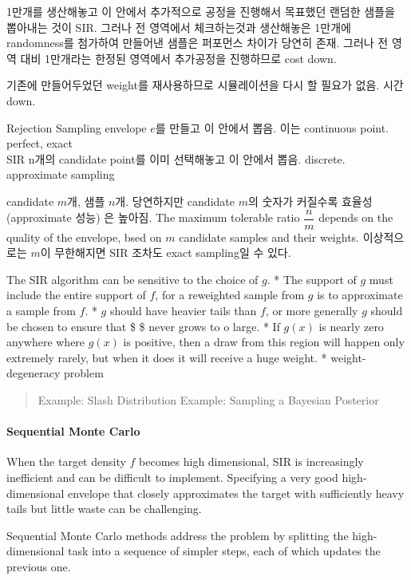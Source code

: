\documentclass[
]{book}
\begin{document}
1만개를 생산해놓고 이 안에서 추가적으로 공정을 진행해서 목표했던 랜덤한 샘플을 뽑아내는 것이 SIR. 그러나 전 영역에서 체크하는것과 생산해놓은 1만개에 randomness를 첨가하여 만들어낸 샘플은 퍼포먼스 차이가 당연히 존재. 그러나 전 영역 대비 1만개라는 한정된 영역에서 추가공정을 진행하므로 cost down.

기존에 만들어두었던 weight를 재사용하므로 시뮬레이션을 다시 할 필요가 없음. 시간 down.

Rejection Sampling \textbar{} envelope \(e\)를 만들고 이 안에서 뽑음. 이는 continuous point. \textbar{} perfect, exact \textbar{}\\
SIR \textbar{} n개의 candidate point를 이미 선택해놓고 이 안에서 뽑음. discrete. \textbar{} approximate sampling \textbar{}

candidate \(m\)개, 샘플 \(n\)개. 당연하지만 candidate \(m\)의 숫자가 커질수록 효율성 (approximate 성능) 은 높아짐. The maximum tolerable ratio \(\dfrac n m\) depends on the quality of the envelope, bsed on \(m\) candidate samples and their weights. 이상적으로는 \(m\)이 무한해지면 SIR 조차도 exact sampling일 수 있다.

The SIR algorithm can be sensitive to the choice of \(g\).
* The support of \(g\) must include the entire support of \(f\), for a reweighted sample from \(g\) is to approximate a sample from \(f\).
* \(g\) should have heavier tails than \(f\), or more generally \(g\) should be chosen to ensure that \$ \$ never grows to o large.
* If \(g(x)\) is nearly zero anywhere where \(g(x)\) is positive, then a draw from this region will happen only extremely rarely, but when it does it will receive a huge weight.
* weight-degeneracy problem

\begin{quote}
Example: Slash Distribution
Example: Sampling a Bayesian Posterior
\end{quote}

\hypertarget{sequential-monte-carlo}{%
\paragraph{Sequential Monte Carlo}\label{sequential-monte-carlo}}

When the target density \(f\) becomes high dimensional, SIR is increasingly inefficient and can be difficult to implement. Specifying a very good high-dimensional envelope that closely approximates the target with sufficiently heavy tails but little waste can be challenging.

Sequential Monte Carlo methods address the problem by splitting the high-dimensional task into a sequence of simpler steps, each of which updates the previous one.
\end{document}
